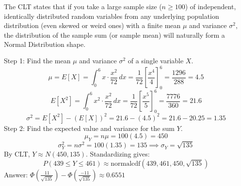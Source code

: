 \documentclass[12pt]{article}
\begin{document}
\begin{enumerate}


The CLT states that if you take a large sample size ($n \ge 100$) of independent, identically distributed random variables from any underlying population distribution (even skewed or weird ones) with a finite mean $\mu$ and variance $\sigma^2$, the distribution of the sample sum (or sample mean) will naturally form a Normal Distribution shape.


Step 1: Find the mean $\mu$ and variance $\sigma^2$ of a single variable $X$.$$\mu = E[X] = \int_{0}^{6} x \cdot \frac{x^2}{72} \,dx = \frac{1}{72} \left[ \frac{x^4}{4} \right]_{0}^{6} = \frac{1296}{288} = 4.5$$$$E[X^2] = \int_{0}^{6} x^2 \cdot \frac{x^2}{72} \,dx = \frac{1}{72} \left[ \frac{x^5}{5} \right]_{0}^{6} = \frac{7776}{360} = 21.6$$$$\sigma^2 = E[X^2] - (E[X])^2 = 21.6 - (4.5)^2 = 21.6 - 20.25 = 1.35$$Step 2: Find the expected value and variance for the sum $Y$.$$\mu_Y = n\mu = 100(4.5) = 450$$$$\sigma^2_Y = n\sigma^2 = 100(1.35) = 135 \implies \sigma_Y = \sqrt{135}$$By CLT, $Y \approx N(450, 135)$. Standardizing gives:$$P(439 \le Y \le 461) \approx \text{normalcdf}(439, 461, 450, \sqrt{135})$$Answer: $\Phi\left(\frac{11}{\sqrt{135}}\right) - \Phi\left(\frac{-11}{\sqrt{135}}\right) \approx 0.6551$
\newpage
{}
\end{enumerate}
\end{document}
